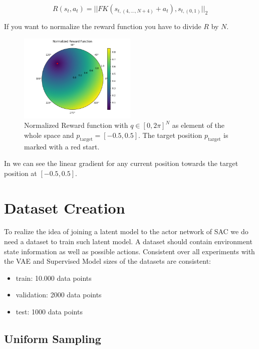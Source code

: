 \begin{equation}\label{eqn:Rewardfunction}
    R(s_t, a_t) = ||FK(s_{t, (4, \ldots, N + 4)}  + a_t), s_{t, (0 ,1)}||_2
\end{equation}

If you want to normalize the reward function you have to divide $R$ by $N$.

\begin{figure}[h]
	\centering
	\includegraphics[width=0.5\textwidth,]{figures/methodology/RewardFunction.png}
	\caption[Reward function]{Normalized Reward function with $q \in [0, 2\pi]^N$ as element of the whole space and $p_\text{target} = [-0.5, 0.5]$. The target position $p_\text{target}$ is marked with a red start.}
	\label{fig:Reward_function}
\end{figure}

In  we can see the linear gradient for any current position towards the target position at $[-0.5, 0.5]$.

\section{Dataset Creation} \label{sec:Dataset_creation}

To realize the idea of joining a latent model to the actor network of SAC we do need a dataset to train such latent model. A dataset should contain environment state information as well as possible actions.
Consistent over all experiments with the VAE and Supervised Model sizes of the datasets are consistent:
\begin{itemize}
    \item train: 10.000 data points
    \item validation: 2000 data points
    \item test: 1000 data points
\end{itemize}

\subsection{Uniform Sampling} \label{sec:vanilla_sampling}

